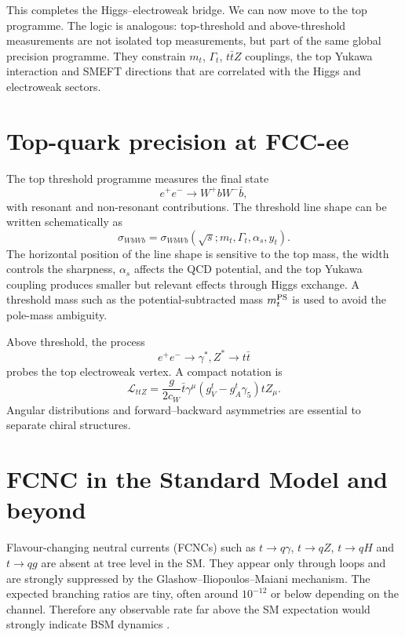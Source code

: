 \documentclass[11pt,a4paper]{report}
\newcommand{\ee}{e^+e^-}
\begin{document}
This completes the Higgs--electroweak bridge.  We can now move to the top
programme.  The logic is analogous: top-threshold and above-threshold
measurements are not isolated top measurements, but part of the same global
precision programme.  They constrain \(m_t\), \(\Gamma_t\), \(t\bar t Z\)
couplings, the top Yukawa interaction and SMEFT directions that are correlated
with the Higgs and electroweak sectors.





\clearpage



\section{Top-quark precision at FCC-ee}

The top threshold programme measures the final state
\begin{equation}
  \ee\to W^+bW^-\bar b,
\end{equation}
with resonant and non-resonant contributions.  The threshold line shape can be written schematically as
\begin{equation}
  \sigma_{WbWb}=\sigma_{WbWb}(\sqrt{s};m_t,\Gamma_t,\alpha_s,y_t).
\end{equation}
The horizontal position of the line shape is sensitive to the top mass, the width controls the sharpness, $\alpha_s$ affects the QCD potential, and the top Yukawa coupling produces smaller but relevant effects through Higgs exchange.  A threshold mass such as the potential-subtracted mass $m_t^{\rm PS}$ is used to avoid the pole-mass ambiguity.

Above threshold, the process
\begin{equation}
  \ee\to \gamma^*,Z^*\to t\bar t
\end{equation}
probes the top electroweak vertex.  A compact notation is
\begin{equation}
  \mathcal L_{ttZ}=\frac{g}{2c_W}\bar t\gamma^\mu\left(g_V^t-g_A^t\gamma_5\right)tZ_\mu.
\end{equation}
Angular distributions and forward--backward asymmetries are essential to separate chiral structures.

\section{FCNC in the Standard Model and beyond}

Flavour-changing neutral currents (FCNCs) such as $t\to q\gamma$, $t\to qZ$, $t\to qH$ and $t\to qg$ are absent at tree level in the SM.  They appear only through loops and are strongly suppressed by the Glashow--Iliopoulos--Maiani mechanism.  The expected branching ratios are tiny, often around $10^{-12}$ or below depending on the channel.  Therefore any observable rate far above the SM expectation would strongly indicate BSM dynamics \cite{AguilarSaavedra2004}.
\end{document}
